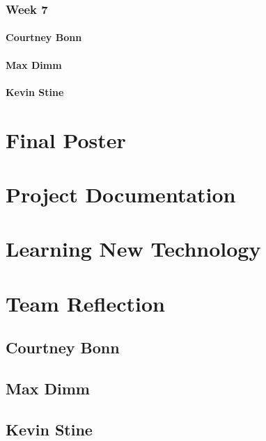 \documentclass[letterpaper,10pt,draftclsnofoot,onecolumn,titlepage]{IEEEtran}
\begin{document}
		\subsubsection{Week 7}
		
			\paragraph{Courtney Bonn}

			\paragraph{Max Dimm}
			
			\paragraph{Kevin Stine}

		
\section{Final Poster}

\section{Project Documentation}

\section{Learning New Technology}

\section{Team Reflection}

	\subsection{Courtney Bonn}
	
	\subsection{Max Dimm}
	
	\subsection{Kevin Stine}
	
\end{document}
